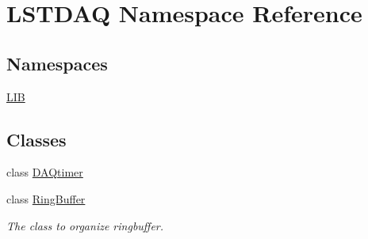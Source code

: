 \hypertarget{namespace_l_s_t_d_a_q}{}\section{L\+S\+T\+D\+A\+Q Namespace Reference}
\label{namespace_l_s_t_d_a_q}
\subsection*{Namespaces}
\begin{DoxyCompactItemize}
\item 
 \hyperlink{namespace_l_s_t_d_a_q_1_1_l_i_b}{L\+I\+B}
\end{DoxyCompactItemize}
\subsection*{Classes}
\begin{DoxyCompactItemize}
\item 
class \hyperlink{class_l_s_t_d_a_q_1_1_d_a_qtimer}{D\+A\+Qtimer}
\item 
class \hyperlink{class_l_s_t_d_a_q_1_1_ring_buffer}{Ring\+Buffer}
\begin{DoxyCompactList}\small\item\em The class to organize ringbuffer. \end{DoxyCompactList}\end{DoxyCompactItemize}
